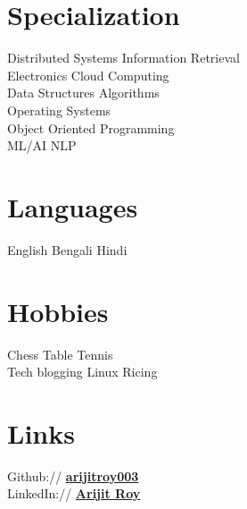 \documentclass[]{deedy-resume-reversed}
\begin{document}
\begin{multicols}{2}
\section{Specialization}
\needspace{5cm}
\needspace{10cm}
Distributed Systems  \textbullet{} Information Retrieval \\
Electronics \textbullet{} Cloud Computing \\
Data Structures Algorithms \\
Operating Systems \\
Object Oriented Programming \\
ML/AI \textbullet{} NLP \\
\sectionsep


\needspace{1.5cm}
\section{Languages}
English \textbullet{} Bengali \textbullet{} Hindi
\sectionsep

\needspace{1.5cm}
\section{Hobbies}
Chess \textbullet{} Table Tennis \\
Tech blogging \textbullet{} Linux Ricing
\sectionsep

\needspace{1.5cm}
\section{Links}
Github:// \href{https://github.com/arijitroy003}{\bf arijitroy003} \\
LinkedIn://  \href{https://www.linkedin.com/in/sudo-kill}{\bf Arijit Roy}
\sectionsep

\end{multicols}
\end{document}

